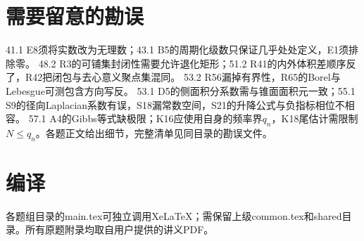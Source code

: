 \documentclass[UTF8,fontset=fandol,11pt]{ctexart}
\begin{document}
\section*{需要留意的勘误}
41.1 E8须将实数改为无理数；43.1 B5的周期化级数只保证几乎处处定义，E1须排除零。
48.2 R3的可铺集封闭性需要允许退化矩形；51.2 R41的内外体积差顺序反了，R42把闭包与去心意义聚点集混同。
53.2 R56漏掉有界性，R65的Borel与Lebesgue可测包含方向写反。
53.1 D5的侧面积分系数需与锥面面积元一致；55.1 S9的径向Laplacian系数有误，S18漏常数空间，S21的升降公式与负指标相位不相容。
57.1 A4的Gibbs等式缺极限；K16应使用自身的频率界$q_n$，K18尾估计需限制$N\le q_n$。各题正文给出细节，完整清单见同目录的勘误文件。
\section*{编译}
各题组目录的main.tex可独立调用XeLaTeX；需保留上级common.tex和shared目录。所有原题附录均取自用户提供的讲义PDF。
\end{document}
